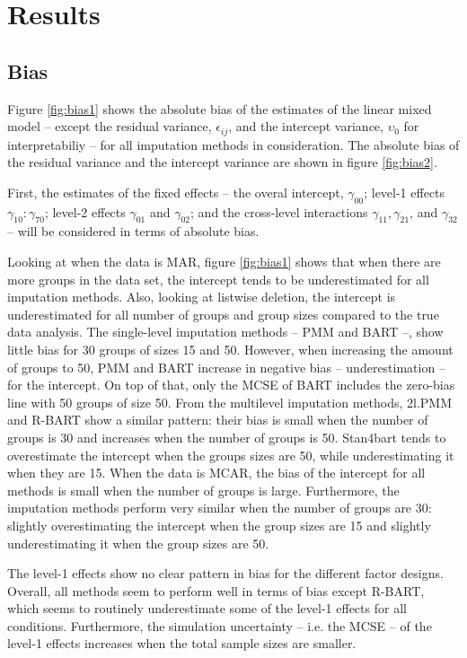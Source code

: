 \documentclass[10pt, a4paper, titlepage]{article}
\begin{document}
\section{Results}
\graphicspath{{./graphs/}}

\subsection{Bias}
Figure \ref{fig:bias1} shows the absolute bias of the estimates of the linear mixed model -- except the residual variance, $\epsilon_{ij}$, and the intercept variance, $\upsilon_{0}$ for interpretabiliy -- for all imputation methods in consideration. The absolute bias of the residual variance and the intercept variance are shown in figure \ref{fig:bias2}.

First, the estimates of the fixed effects -- the overal intercept, $\gamma_{00}$; level-1 effects $\gamma_{10}:\gamma_{70}$; level-2 effects $\gamma_{01}$ and $\gamma_{02}$; and the cross-level interactions $\gamma_{11}, \gamma_{21}$, and $\gamma_{32}$ -- will be considered in terms of absolute bias. 

Looking at when the data is MAR, figure \ref{fig:bias1} shows that when there are more groups in the data set, the intercept tends to be underestimated for all imputation methods. Also, looking at listwise deletion, the intercept is underestimated for all number of groups and group sizes compared to the true data analysis. The single-level imputation methods -- PMM and BART --, show little bias for 30 groups of sizes 15 and 50. However, when increasing the amount of groups to 50, PMM and BART increase in negative bias -- underestimation -- for the intercept. On top of that, only the MCSE of BART includes the zero-bias line with 50 groups of size 50. From the multilevel imputation methods, 2l.PMM and R-BART show a similar pattern: their bias is small when the number of groups is 30 and increases when the number of groups is 50. Stan4bart tends to overestimate the intercept when the groups sizes are 50, while underestimating it when they are 15. When the data is MCAR, the bias of the intercept for all methods is small when the number of groups is large. Furthermore, the imputation methods perform very similar when the number of groups are 30: slightly overestimating the intercept when the group sizes are 15 and slightly underestimating it when the group sizes are 50.

The level-1 effects show no clear pattern in bias for the different factor designs. Overall, all methods seem to perform well in terms of bias except R-BART, which seems to routinely underestimate some of the level-1 effects for all conditions. Furthermore, the simulation uncertainty -- i.e. the MCSE -- of the level-1 effects increases when the total sample sizes are smaller.
\end{document}
